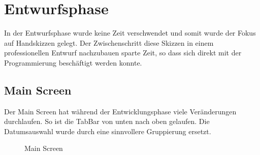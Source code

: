 \documentclass[
    DIV12,
    cleardouble=plain,
    headings=normal,
    pdftex,
    headexclude,footexclude,
    final
]{scrreprt}
\begin{document}
\newpage

\chapter{Entwurfsphase}
In der Entwurfsphase wurde keine Zeit verschwendet und somit wurde der Fokus auf Handskizzen gelegt. Der Zwischenschritt diese Skizzen in einem professionellen Entwurf nachzubauen sparte Zeit, so dass sich direkt mit der Programmierung beschäftigt werden konnte.


\section{Main Screen}
Der Main Screen hat während der Entwicklungsphase viele Veränderungen durchlaufen. So ist die TabBar von unten nach oben gelaufen. Die Datumsauswahl wurde durch eine sinnvollere Gruppierung ersetzt.
\begin{figure}[H]
	\centering
	\caption{Main Screen}
	\label{main}
\end{figure}
\end{document}
